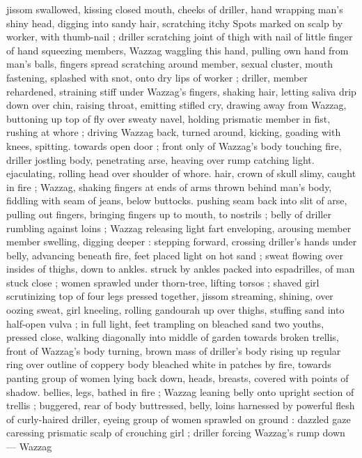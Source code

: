 jissom swallowed, kissing closed mouth, cheeks of driller, hand 
wrapping man's shiny head, digging into sandy hair, scratching itchy 
Spots marked on scalp by worker, with thumb-nail ; driller scratching 
joint of thigh with nail of little finger of hand squeezing members, 
Wazzag waggling this hand, pulling own hand from man's balls, 
fingers spread scratching around member, sexual cluster, mouth 
fastening, splashed with snot, onto dry lips of worker ; driller, 
member rehardened, straining stiff under Wazzag's fingers, shaking 
hair, letting saliva drip down over chin, raising throat, emitting stifled 
cry, drawing away from Wazzag, buttoning up top of fly over sweaty 
navel, holding prismatic member in fist, rushing at whore ; driving 
Wazzag back, turned around, kicking, goading with knees, spitting. 
towards open door ; front only of Wazzag's body touching fire, driller 
jostling body, penetrating arse, heaving over rump catching light. 
ejaculating, rolling head over shoulder of whore. hair, crown of skull 
slimy, caught in fire ; Wazzag, shaking fingers at ends of arms thrown 
behind man's body, fiddling with seam of jeans, below buttocks. 
pushing seam back into slit of arse, pulling out fingers, bringing 
fingers up to mouth, to nostrils ; belly of driller rumbling against 
loins ; Wazzag releasing light fart enveloping, arousing member 
member swelling, digging deeper : stepping forward, crossing 
driller's hands under belly, advancing beneath fire, feet placed light 
on hot sand ; sweat flowing over insides of thighs, down to ankles. 
struck by ankles packed into espadrilles, of man stuck close ; women 
sprawled under thorn-tree, lifting torsos ; shaved girl scrutinizing top 
of four legs pressed together, jissom streaming, shining, over oozing 
sweat, girl kneeling, rolling gandourah up over thighs, stuffing sand 
into half-open vulva ; in full light, feet trampling on bleached sand 
two youths, pressed close, walking diagonally into middle of garden 
towards broken trellis, front of Wazzag's body turning, brown mass 
of driller's body rising up regular ring over outline of coppery body 
bleached white in patches by fire, towards panting group of women 
lying back down, heads, breasts, covered with points of shadow. 
bellies, legs, bathed in fire ; Wazzag leaning belly onto upright 
section of trellis ; buggered, rear of body buttressed, belly, loins 
harnessed by powerful flesh of curly-haired driller, eyeing group of 
women sprawled on ground : dazzled gaze caressing prismatic scalp 
of crouching girl ; driller forcing Wazzag's rump down --- Wazzag 
